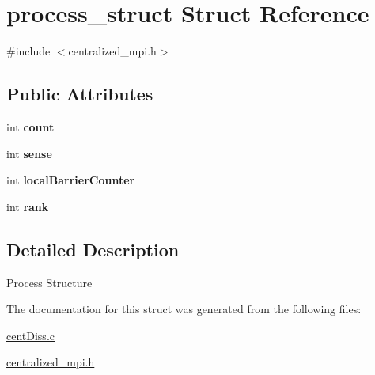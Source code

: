 \hypertarget{structprocess__struct}{\section{process\-\_\-struct \-Struct \-Reference}
\label{structprocess__struct}
}


{\ttfamily \#include $<$centralized\-\_\-mpi.\-h$>$}

\subsection*{\-Public \-Attributes}
\begin{DoxyCompactItemize}
\item 
\hypertarget{structprocess__struct_a153dc7caabc598a34a65f4eef7f809f1}{int {\bfseries count}}\label{structprocess__struct_a153dc7caabc598a34a65f4eef7f809f1}

\item 
\hypertarget{structprocess__struct_a971bc4434af8dd1de724a4c83396249b}{int {\bfseries sense}}\label{structprocess__struct_a971bc4434af8dd1de724a4c83396249b}

\item 
\hypertarget{structprocess__struct_ad1d23963fad7393eb2f6604b7fd1b084}{int {\bfseries local\-Barrier\-Counter}}\label{structprocess__struct_ad1d23963fad7393eb2f6604b7fd1b084}

\item 
\hypertarget{structprocess__struct_a4b855251bfe402e0d449907849660d03}{int {\bfseries rank}}\label{structprocess__struct_a4b855251bfe402e0d449907849660d03}

\end{DoxyCompactItemize}


\subsection{\-Detailed \-Description}
\-Process \-Structure 

\-The documentation for this struct was generated from the following files\-:\begin{DoxyCompactItemize}
\item 
\hyperlink{centDiss_8c}{cent\-Diss.\-c}\item 
\hyperlink{centralized__mpi_8h}{centralized\-\_\-mpi.\-h}\end{DoxyCompactItemize}
